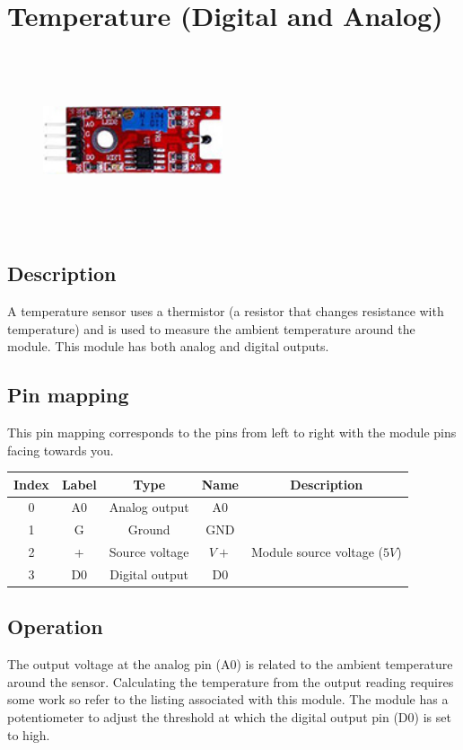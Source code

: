 \section{Temperature (Digital and Analog)}
\begin{figure}[H]
    \centering
    \includegraphics[angle=0, keepaspectratio=true, scale=1, width=200px, height=200px]{images/temperature_digital_analog.jpg}
\end{figure}
\subsection*{Description}
A temperature sensor uses a thermistor (a resistor that changes resistance with temperature) and is used to measure the ambient temperature around the module. This module has both analog and digital outputs.
\subsection*{Pin mapping}
This pin mapping corresponds to the pins from left to right with the module pins facing towards you.
\begin{table}[H]
    \centering
    \begin{tabular}{|c|c|c|c|c|}
    \hline
    Index &Label &Type &Name &Description\\ \hline
    0 &A0 &Analog output &A0 &\\ \hline
    1 &G &Ground &GND &\\ \hline
    2 &+ &Source voltage &$V+$ &Module source voltage ($5V$)\\ \hline
    3 &D0 &Digital output &D0 &\\ \hline
    \end{tabular}
\end{table}
\subsection*{Operation}
The output voltage at the analog pin (A0) is related to the ambient temperature around the sensor. Calculating the temperature from the output reading requires some work so refer to the listing associated with this module.
The module has a potentiometer to adjust the threshold at which the digital output pin (D0) is set to high.
%